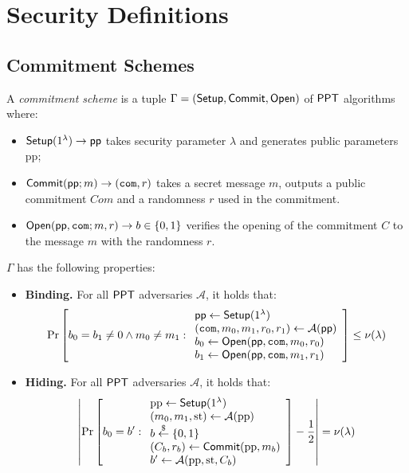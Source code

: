 \section{Security Definitions}

\subsection{Commitment Schemes}
\label{app:com}

\begin{definition} \label{def: commitment}
     A \emph{commitment scheme} is a tuple $\Gamma = (\mathsf{Setup}, \mathsf{Commit}, \mathsf{Open})$ of $\mathsf{PPT}$ algorithms where:
    \begin{itemize} %
        \item $\mathsf{Setup}(1^{\lambda}) \rightarrow \mathsf{pp}$ takes security parameter $\lambda$ and generates public parameters $\text{pp}$;
        \item $\mathsf{Commit}(\mathsf{pp}; m) \rightarrow (\mathtt{com},r)$ takes a secret message $m$, outputs a public commitment $Com$ and a randomness $r$ used in the commitment.
        \item $\mathsf{Open}(\mathsf{pp}, \mathtt{com}; m, r) \rightarrow b \in \{0,1\}$ verifies the opening of the commitment $C$ to the message $m$ with the randomness $r$.
    \end{itemize}
    
    $\Gamma$ has the following properties:
    \begin{itemize} %
    \item {\bf Binding.} For all $\mathsf{PPT}$ adversaries $\mathcal{A}$, it holds that:
    \[
        \Pr\left[
            b_0 = b_1 \neq 0 \land m_0 \neq m_1 :
            \begin{array}{l}
                \mathsf{pp} \leftarrow \mathsf{Setup}(1^{\lambda}) \\
                (\mathtt{com}, m_0, m_1, r_0, r_1) \leftarrow \mathcal{A}(\mathsf{pp}) \\
                b_0 \leftarrow \mathsf{Open}(\mathsf{pp}, \mathtt{com}, m_0, r_0) \\
                b_1 \leftarrow \mathsf{Open}(\mathsf{pp}, \mathtt{com}, m_1, r_1)
            \end{array}
        \right] \leq \nu(\lambda)
    \]
    \item {\bf Hiding.} For all $\mathsf{PPT}$ adversaries $\mathcal{A}$, it holds that:
    \[
       \left|\Pr\left[
            b_0 = b' :
            \begin{array}{l}
                \text{pp} \leftarrow \mathsf{Setup}(1^{\lambda}) \\
                (m_0, m_1, \text{st}) \leftarrow \mathcal{A}(\text{pp}) \\
                b \overset{\$}{\leftarrow} \{0, 1\} \\
                (C_b, r_b) \leftarrow \mathsf{Commit}(\text{pp}, m_b) \\
                b' \leftarrow \mathcal{A}(\text{pp}, \text{st}, C_b)
            \end{array}
        \right] - \frac{1}{2} \right| = \nu(\lambda)
    \]
    \end{itemize}


\end{definition}
